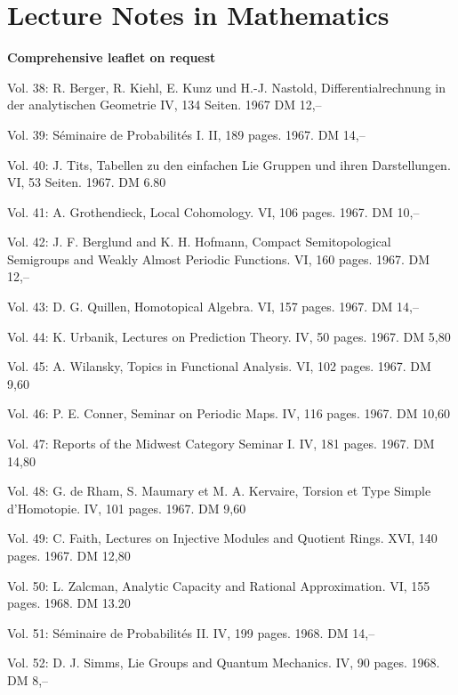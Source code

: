 

\section*{Lecture Notes in Mathematics}
\textbf{Comprehensive leaflet on request}

Vol. 38: R. Berger, R. Kiehl, E. Kunz und H.-J. Nastold, Differentialrechnung in der analytischen Geometrie IV, 134 Seiten. 1967 DM 12,--

Vol. 39: Séminaire de Probabilités I. II, 189 pages. 1967. DM 14,--

Vol. 40: J. Tits, Tabellen zu den einfachen Lie Gruppen und ihren Darstellungen. VI, 53 Seiten. 1967. DM 6.80

Vol. 41: A. Grothendieck, Local Cohomology. VI, 106 pages. 1967. DM 10,--

Vol. 42: J. F. Berglund and K. H. Hofmann, Compact Semitopological Semigroups and Weakly Almost Periodic Functions. VI, 160 pages. 1967. DM 12,--

Vol. 43: D. G. Quillen, Homotopical Algebra. VI, 157 pages. 1967. DM 14,--

Vol. 44: K. Urbanik, Lectures on Prediction Theory. IV, 50 pages. 1967. DM 5,80

Vol. 45: A. Wilansky, Topics in Functional Analysis. VI, 102 pages. 1967. DM 9,60

Vol. 46: P. E. Conner, Seminar on Periodic Maps. IV, 116 pages. 1967. DM 10,60

Vol. 47: Reports of the Midwest Category Seminar I. IV, 181 pages. 1967. DM 14,80

Vol. 48: G. de Rham, S. Maumary et M. A. Kervaire, Torsion et Type Simple d'Homotopie. IV, 101 pages. 1967. DM 9,60

Vol. 49: C. Faith, Lectures on Injective Modules and Quotient Rings. XVI, 140 pages. 1967. DM 12,80

Vol. 50: L. Zalcman, Analytic Capacity and Rational Approximation. VI, 155 pages. 1968. DM 13.20

Vol. 51: Séminaire de Probabilités II. IV, 199 pages. 1968. DM 14,--

Vol. 52: D. J. Simms, Lie Groups and Quantum Mechanics. IV, 90 pages. 1968. DM 8,--

